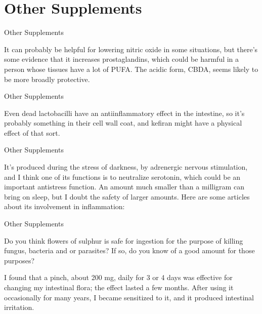 \documentclass[11pt,oneside,openany,extrafontsizes]{memoir}
\begin{document}
\section{Other Supplements}

\begin{standalonequote}{Other Supplements}

    \begin{answer}
      It can probably be helpful for lowering nitric oxide in some situations, but there's some evidence that it increases prostaglandins, which could be harmful in a person whose tissues have a lot of PUFA. The acidic form, CBDA, seems likely to be more broadly protective.
    \end{answer}
\end{standalonequote}

\begin{standalonequote}{Other Supplements}

    \begin{answer}
      Even dead lactobacilli have an antiinflammatory effect in the intestine, so it's probably something in their cell wall coat, and kefiran might have a physical effect of that sort.
    \end{answer}
\end{standalonequote}

\begin{standalonequote}{Other Supplements}

    \begin{answer}
      It's produced during the stress of darkness, by adrenergic nervous stimulation, and I think one of its functions is to neutralize serotonin, which could be an important antistress function. An amount much smaller than a milligram can bring on sleep, but I doubt the safety of larger amounts. Here are some articles about its involvement in inflammation:
    \end{answer}
\end{standalonequote}

\begin{qaexchange}{Other Supplements}

    \begin{question}
        Do you think flowers of sulphur is safe for ingestion for the purpose of killing fungus, bacteria and or parasites? If so, do you know of a good amount for those purposes?
    \end{question}

    \begin{answer}
      I found that a pinch, about 200 mg, daily for 3 or 4 days was effective for changing my intestinal flora; the effect lasted a few months. After using it occasionally for many years, I became sensitized to it, and it produced intestinal irritation.
    \end{answer}
\end{qaexchange}
\end{document}
